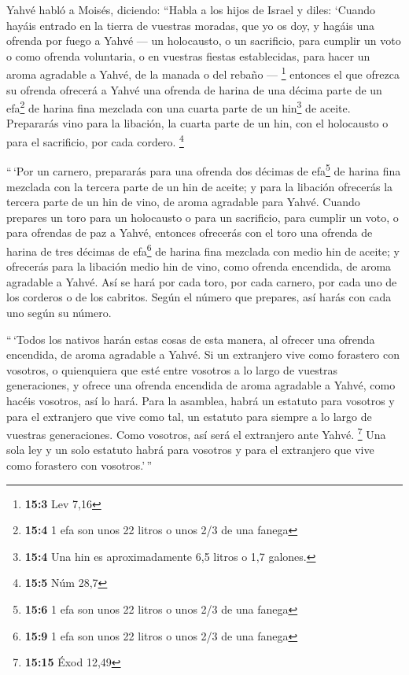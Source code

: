 \begin{paracol}{2}
 Yahvé habló a Moisés, diciendo:  ``Habla a
los hijos de Israel y diles: `Cuando hayáis entrado en la tierra de
vuestras moradas, que yo os doy,  y hagáis una ofrenda por
fuego a Yahvé --- un holocausto, o un sacrificio, para cumplir un voto o
como ofrenda voluntaria, o en vuestras fiestas establecidas, para hacer
un aroma agradable a Yahvé, de la manada o del rebaño --- \footnote{\textbf{15:3}
  Lev 7,16}  entonces el que ofrezca su ofrenda ofrecerá a
Yahvé una ofrenda de harina de una décima parte de un efa\footnote{\textbf{15:4}
  1 efa son unos 22 litros o unos 2/3 de una fanega} de harina fina
mezclada con una cuarta parte de un hin\footnote{\textbf{15:4} Una hin
  es aproximadamente 6,5 litros o 1,7 galones.} de aceite.
 Prepararás vino para la libación, la cuarta parte de un
hin, con el holocausto o para el sacrificio, por cada cordero.
\footnote{\textbf{15:5} Núm 28,7}

 ``\,`Por un carnero, prepararás para una ofrenda dos
décimas de efa\footnote{\textbf{15:6} 1 efa son unos 22 litros o unos
  2/3 de una fanega} de harina fina mezclada con la tercera parte de un
hin de aceite;  y para la libación ofrecerás la tercera
parte de un hin de vino, de aroma agradable para Yahvé. 
Cuando prepares un toro para un holocausto o para un sacrificio, para
cumplir un voto, o para ofrendas de paz a Yahvé,  entonces
ofrecerás con el toro una ofrenda de harina de tres décimas de
efa\footnote{\textbf{15:9} 1 efa son unos 22 litros o unos 2/3 de una
  fanega} de harina fina mezclada con medio hin de aceite;
 y ofrecerás para la libación medio hin de vino, como
ofrenda encendida, de aroma agradable a Yahvé.  Así se
hará por cada toro, por cada carnero, por cada uno de los corderos o de
los cabritos.  Según el número que prepares, así harás
con cada uno según su número.

 ``\,`Todos los nativos harán estas cosas de esta manera,
al ofrecer una ofrenda encendida, de aroma agradable a Yahvé.
 Si un extranjero vive como forastero con vosotros, o
quienquiera que esté entre vosotros a lo largo de vuestras generaciones,
y ofrece una ofrenda encendida de aroma agradable a Yahvé, como hacéis
vosotros, así lo hará.  Para la asamblea, habrá un
estatuto para vosotros y para el extranjero que vive como tal, un
estatuto para siempre a lo largo de vuestras generaciones. Como
vosotros, así será el extranjero ante Yahvé. \footnote{\textbf{15:15}
  Éxod 12,49}  Una sola ley y un solo estatuto habrá para
vosotros y para el extranjero que vive como forastero con vosotros.'\,''


\end{paracol}
